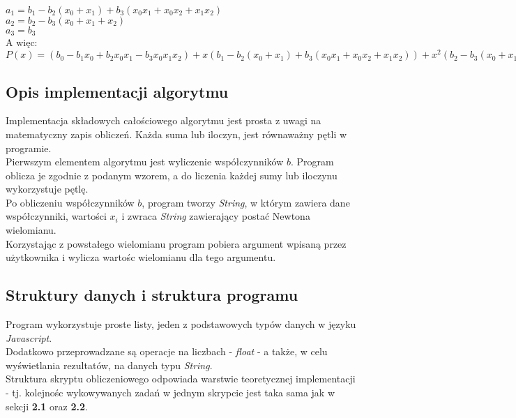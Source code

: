 \documentclass[a4paper,12pt]{article}
\newcommand{\id}{\noindent}
\begin{document}
$a_1 = b_1 - b_2(x_0 + x_1) + b_3(x_0x_1 + x_0x_2 + x_1x_2)$ \\

$a_2 = b_2 - b_3(x_0 + x_1 + x_2)$ \\

$a_3 = b_3$ \\

\id
A więc: \\

$P(x) = (b_0 - b_1x_0 + b_2x_0x_1 - b_3x_0x_1x_2) + x(b_1 - b_2(x_0 + x_1) + b_3(x_0x_1 + x_0x_2 + x_1x_2)) + x^2(b_2 - b_3(x_0 + x_1 + x_2)) + x^3b_3$ \\

\subsection{Opis implementacji algorytmu}

\id
Implementacja składowych całościowego algorytmu jest prosta z uwagi na matematyczny zapis obliczeń. Każda suma lub iloczyn, jest równaważny pętli w programie. \\

\id
Pierwszym elementem algorytmu jest wyliczenie współczynników $b$. Program oblicza je zgodnie z podanym wzorem, a do liczenia każdej sumy lub iloczynu wykorzystuje pętlę. \\


\id
Po obliczeniu współczynników $b$, program tworzy \textit{String}, w którym zawiera dane współczynniki, wartości $x_i$ i zwraca \textit{String} zawierający postać Newtona wielomianu. \\

\id
Korzystając z powstałego wielomianu program pobiera argument wpisaną przez użytkownika i wylicza wartośc wielomianu dla tego argumentu.

\subsection{Struktury danych i struktura programu}

\id
Program wykorzystuje proste listy, jeden z podstawowych typów danych w języku \textit{Javascript}. \\

\id
Dodatkowo przeprowadzane są operacje na liczbach - \textit{float} - a także, w celu wyświetlania rezultatów, na danych typu \textit{String}. \\

\id
Struktura skryptu obliczeniowego odpowiada warstwie teoretycznej implementacji - tj. kolejnośc wykowywanych zadań w jednym skrypcie jest taka sama jak w sekcji \textbf{2.1} oraz \textbf{2.2}. \\
\end{document}
